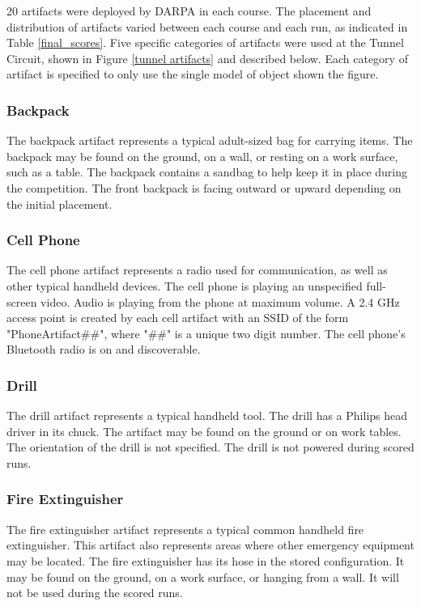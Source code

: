 20 artifacts were deployed by DARPA in each course. The placement and distribution of artifacts varied between each course and each run, as indicated in Table \ref{final_scores}. Five specific categories of artifacts were used at the Tunnel Circuit, shown in Figure \ref{tunnel artifacts} and described below. Each category of artifact is specified to only use the single model of object shown the figure.

\subsubsection{Backpack}

The backpack artifact represents a typical adult-sized bag for carrying items. The backpack may be found on the ground, on a wall, or resting on a work surface, such as a table. The backpack contains a sandbag to help keep it in place during the competition. The front backpack is facing outward or upward depending on the initial placement.

\subsubsection{Cell Phone}

The cell phone artifact represents a radio used for communication, as well as other typical handheld devices. The cell phone is playing an unspecified full-screen video. Audio is playing from the phone at maximum volume. A 2.4 GHz access point is created by each cell artifact with an SSID of the form "PhoneArtifact\#\#", where "\#\#" is a unique two digit number. The cell phone's Bluetooth radio is on and discoverable.

\subsubsection{Drill}

The drill artifact represents a typical handheld tool. The drill has a Philips head driver in its chuck. The artifact may be found on the ground or on work tables. The orientation of the drill is not specified. The drill is not powered during scored runs.

\subsubsection{Fire Extinguisher}

The fire extinguisher artifact represents a typical common handheld fire extinguisher. This artifact also represents areas where other emergency equipment may be located. The fire extinguisher has its hose in the stored configuration. It may be found on the ground, on a work surface, or hanging from a wall. It will not be used during the scored runs.

